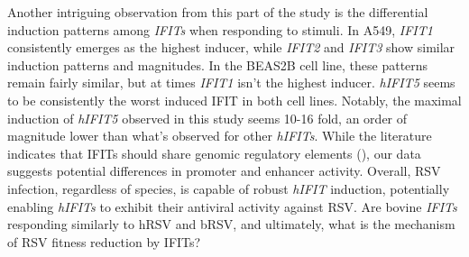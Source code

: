 Another intriguing observation from this part of the study is the differential induction patterns among \textit{IFITs} when responding to stimuli. In A549, \textit{IFIT1} consistently emerges as the highest inducer, while \textit{IFIT2} and \textit{IFIT3} show similar induction patterns and magnitudes. In the BEAS2B cell line, these patterns remain fairly similar, but at times \textit{IFIT1} isn't the highest inducer. \textit{hIFIT5} seems to be consistently the worst induced IFIT in both cell lines. Notably, the maximal induction of \textit{hIFIT5} observed in this study seems 10-16 fold, an order of magnitude lower than what's observed for other \textit{hIFITs}. While the literature indicates that IFITs should share genomic regulatory elements (\cite{Lou2009IFR-9/STAT2STAT1}), our data suggests potential differences in promoter and enhancer activity. Overall, RSV infection, regardless of species, is capable of robust \textit{hIFIT} induction, potentially enabling \textit{hIFITs} to exhibit their antiviral activity against RSV. Are bovine \textit{IFITs} responding similarly to hRSV and bRSV, and ultimately, what is the mechanism of RSV fitness reduction by IFITs?


